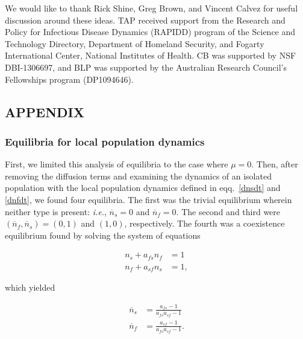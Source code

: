 \documentclass[11pt]{article}
\newcommand{\ie}{{\em i.e.}, }
\begin{document}
We would like to thank Rick Shine, Greg Brown, and Vincent Calvez for useful discussion around these ideas.  TAP received support from the Research and Policy for Infectious Disease Dynamics (RAPIDD) program of the Science and Technology Directory, Department of Homeland Security, and Fogarty International Center, National Institutes of Health. CB was supported by NSF DBI-1306697, and BLP was supported by the Australian Research Council's Fellowships program (DP1094646).






\subsection*{APPENDIX}

\subsubsection*{Equilibria for local population dynamics}

First, we limited this analysis of equilibria to the case where $\mu=0$. Then, after removing the diffusion terms and examining the dynamics of an isolated population with the local population dynamics defined in eqq.~\eqref{dnsdt} and \eqref{dnfdt}, we found four equilibria. The first was the trivial equilibrium wherein neither type is present: \ie $\overline{n}_s = 0$ and $\overline{n}_f = 0$. The second and third were $(\overline{n}_f, \overline{n}_s)=(0,1)$ and $(1,0)$, respectively. The fourth was a coexistence equilibrium found by solving the system of equations

\vspace*{-22pt}
\begin{subequations}
\begin{align}
n_s + a_{fs} n_f & = 1 \\
n_f + a_{sf} n_s & = 1,
\end{align}
\end{subequations}

\noindent which yielded

\vspace*{-22pt}
\begin{subequations}\label{equilib}
\begin{align}
\overline{n}_s & = \frac{a_{fs} - 1}{a_{fs} a_{sf} - 1} \\
\overline{n}_f & = \frac{a_{sf} - 1}{a_{fs} a_{sf} - 1} .
\end{align}
\end{subequations}
\end{document}
